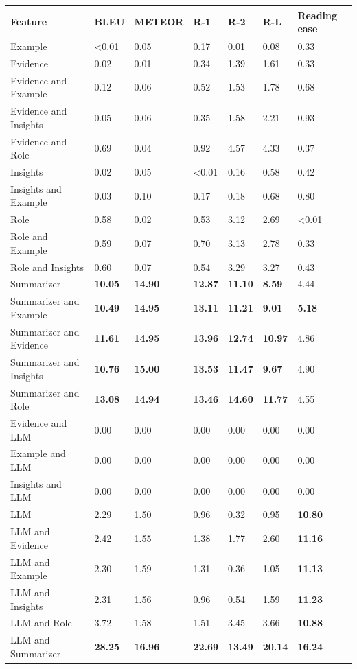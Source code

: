 \begin{tabular}{|l|l|l|l|l|l|l|}
\hline
\textbf{Feature} & BLEU & METEOR & R-1 & R-2 & R-L & Reading ease \\
 \hline
 Example & \textless{}0.01 & 0.05 & 0.17 & 0.01 & 0.08 & 0.33 \\
 \hline
 Evidence & 0.02 & 0.01 & 0.34 & 1.39 & 1.61 & 0.33 \\
 \hline
 Evidence and Example & 0.12 & 0.06 & 0.52 & 1.53 & 1.78 & 0.68 \\
 \hline
 Evidence and Insights & 0.05 & 0.06 & 0.35 & 1.58 & 2.21 & 0.93 \\
 \hline
 Evidence and Role & 0.69 & 0.04 & 0.92 & 4.57 & 4.33 & 0.37 \\
 \hline
 Insights & 0.02 & 0.05 & \textless{}0.01 & 0.16 & 0.58 & 0.42 \\
 \hline
 Insights and Example & 0.03 & 0.10 & 0.17 & 0.18 & 0.68 & 0.80 \\
 \hline
 Role & 0.58 & 0.02 & 0.53 & 3.12 & 2.69 & \textless{}0.01 \\
 \hline
 Role and Example & 0.59 & 0.07 & 0.70 & 3.13 & 2.78 & 0.33 \\
 \hline
 Role and Insights & 0.60 & 0.07 & 0.54 & 3.29 & 3.27 & 0.43 \\
 \hline
 Summarizer & \textbf{10.05} & \textbf{14.90} & \textbf{12.87} & \textbf{11.10} & \textbf{8.59} & 4.44 \\
 \hline
 Summarizer and Example & \textbf{10.49} & \textbf{14.95} & \textbf{13.11} & \textbf{11.21} & \textbf{9.01} & \textbf{5.18} \\
 \hline
 Summarizer and Evidence & \textbf{11.61} & \textbf{14.95} & \textbf{13.96} & \textbf{12.74} & \textbf{10.97} & 4.86 \\
 \hline
 Summarizer and Insights & \textbf{10.76} & \textbf{15.00} & \textbf{13.53} & \textbf{11.47} & \textbf{9.67} & 4.90 \\
 \hline
 Summarizer and Role & \textbf{13.08} & \textbf{14.94} & \textbf{13.46} & \textbf{14.60} & \textbf{11.77} & 4.55 \\
 \hline
 Evidence and LLM & 0.00 & 0.00 & 0.00 & 0.00 & 0.00 & 0.00 \\
 \hline
 Example and LLM & 0.00 & 0.00 & 0.00 & 0.00 & 0.00 & 0.00 \\
 \hline
 Insights and LLM & 0.00 & 0.00 & 0.00 & 0.00 & 0.00 & 0.00 \\
 \hline
 LLM & 2.29 & 1.50 & 0.96 & 0.32 & 0.95 & \textbf{10.80} \\
 \hline
 LLM and Evidence & 2.42 & 1.55 & 1.38 & 1.77 & 2.60 & \textbf{11.16} \\
 \hline
 LLM and Example & 2.30 & 1.59 & 1.31 & 0.36 & 1.05 & \textbf{11.13} \\
 \hline
 LLM and Insights & 2.31 & 1.56 & 0.96 & 0.54 & 1.59 & \textbf{11.23} \\
 \hline
 LLM and Role & 3.72 & 1.58 & 1.51 & 3.45 & 3.66 & \textbf{10.88} \\
 \hline
 LLM and Summarizer & \textbf{28.25} & \textbf{16.96} & \textbf{22.69} & \textbf{13.49} & \textbf{20.14} & \textbf{16.24} \\
\hline
\end{tabular}

